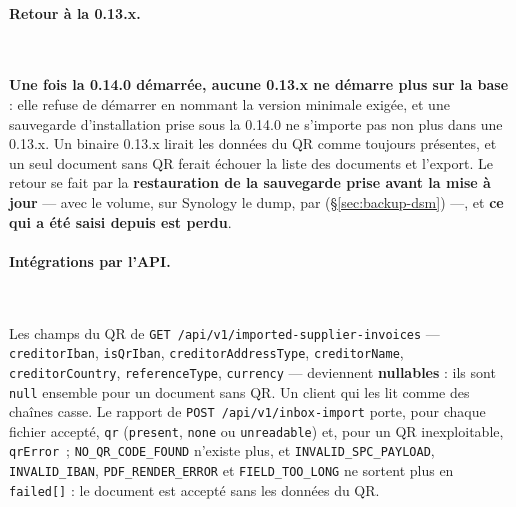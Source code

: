 \documentclass[a4paper,11pt,oneside]{article}
\begin{document}
\paragraph{Retour à la 0.13.x.}\label{sec:maj-0-14-0-retour}\mbox{}\\
\begin{sloppypar}
\textbf{Une fois la 0.14.0 démarrée, aucune 0.13.x ne démarre plus sur la base} : elle refuse de démarrer en nommant la version minimale exigée, et une sauvegarde d'installation prise sous la 0.14.0 ne s'importe pas non plus dans une 0.13.x. Un binaire 0.13.x lirait les données du QR comme toujours présentes, et un seul document sans QR ferait échouer la liste des documents et l'export. Le retour se fait par la \textbf{restauration de la sauvegarde prise avant la mise à jour} --- avec  le volume, sur Synology le dump, par  (\S\ref{sec:backup-dsm}) ---, et \textbf{ce qui a été saisi depuis est perdu}.
\end{sloppypar}

\paragraph{Intégrations par l'API.}\mbox{}\\
\begin{sloppypar}
Les champs du QR de \texttt{GET /api/v1/imported-supplier-invoices} --- \texttt{creditorIban}, \texttt{isQrIban}, \texttt{creditorAddressType}, \texttt{creditorName}, \texttt{creditorCountry}, \texttt{referenceType}, \texttt{currency} --- deviennent \textbf{nullables} : ils sont \texttt{null} ensemble pour un document sans QR. Un client qui les lit comme des chaînes casse. Le rapport de \texttt{POST /api/v1/inbox-import} porte, pour chaque fichier accepté, \texttt{qr} (\texttt{present}, \texttt{none} ou \texttt{unreadable}) et, pour un QR inexploitable, \texttt{qrError}~; \texttt{NO\_QR\_CODE\_FOUND} n'existe plus, et \texttt{INVALID\_SPC\_PAYLOAD}, \texttt{INVALID\_IBAN}, \texttt{PDF\_RENDER\_ERROR} et \texttt{FIELD\_TOO\_LONG} ne sortent plus en \texttt{failed[]} : le document est accepté sans les données du QR.
\end{sloppypar}
\end{document}
